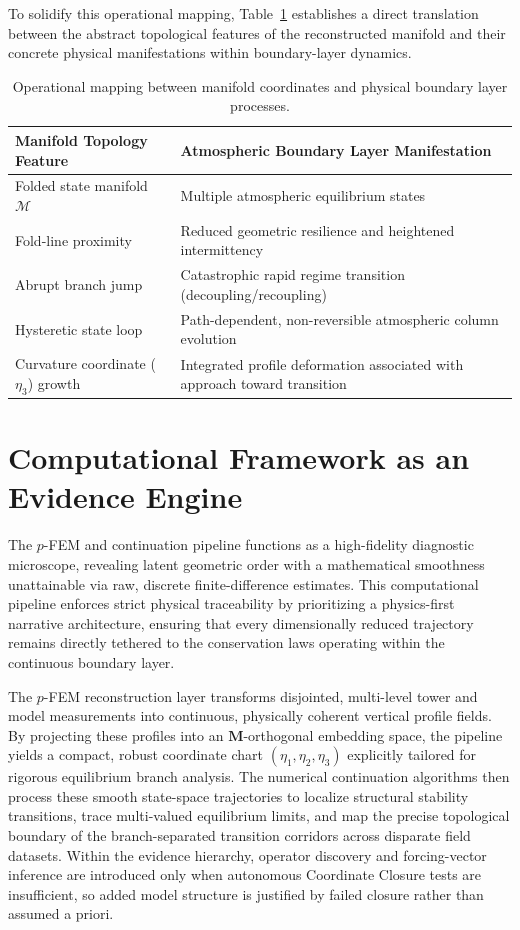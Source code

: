 \documentclass[12pt,a4paper]{article}
\newcommand{\mat}[1]{\mathbf{#1}}
\begin{document}
To solidify this operational mapping, Table~\ref{tab:manifold_translation} establishes a direct translation between the abstract topological features of the reconstructed manifold and their concrete physical manifestations within boundary-layer dynamics.

\begin{table}[htbp]
\centering
\small
\setlength{\tabcolsep}{6pt}
\renewcommand{\arraystretch}{1.1}
\begin{tabularx}{\textwidth}{@{}p{}X@{}}
\toprule
\textbf{Manifold Topology Feature} & \textbf{Atmospheric Boundary Layer Manifestation} \\
\midrule
Folded state manifold~$\mathcal{M}$ & Multiple atmospheric equilibrium states \\
Fold-line proximity & Reduced geometric resilience and heightened intermittency \\
Abrupt branch jump & Catastrophic rapid regime transition (decoupling/recoupling) \\
Hysteretic state loop & Path-dependent, non-reversible atmospheric column evolution \\
Curvature coordinate ($\eta_3$) growth & Integrated profile deformation associated with approach toward transition \\
\bottomrule
\end{tabularx}
\caption{Operational mapping between manifold coordinates and physical boundary layer processes.}
\label{tab:manifold_translation}
\end{table}
\section{Computational Framework as an Evidence Engine}

The $p$-FEM and continuation pipeline functions as a high-fidelity diagnostic microscope, revealing latent geometric order with a mathematical smoothness unattainable via raw, discrete finite-difference estimates. This computational pipeline enforces strict physical traceability by prioritizing a physics-first narrative architecture, ensuring that every dimensionally reduced trajectory remains directly tethered to the conservation laws operating within the continuous boundary layer.

The $p$-FEM reconstruction layer transforms disjointed, multi-level tower and model measurements into continuous, physically coherent vertical profile fields. By projecting these profiles into an $\mat{M}$-orthogonal embedding space, the pipeline yields a compact, robust coordinate chart $(\eta_1, \eta_2, \eta_3)$ explicitly tailored for rigorous equilibrium branch analysis. The numerical continuation algorithms then process these smooth state-space trajectories to localize structural stability transitions, trace multi-valued equilibrium limits, and map the precise topological boundary of the branch-separated transition corridors across disparate field datasets. Within the evidence hierarchy, operator discovery and forcing-vector inference are introduced only when autonomous Coordinate Closure tests are insufficient, so added model structure is justified by failed closure rather than assumed a priori.
\end{document}
